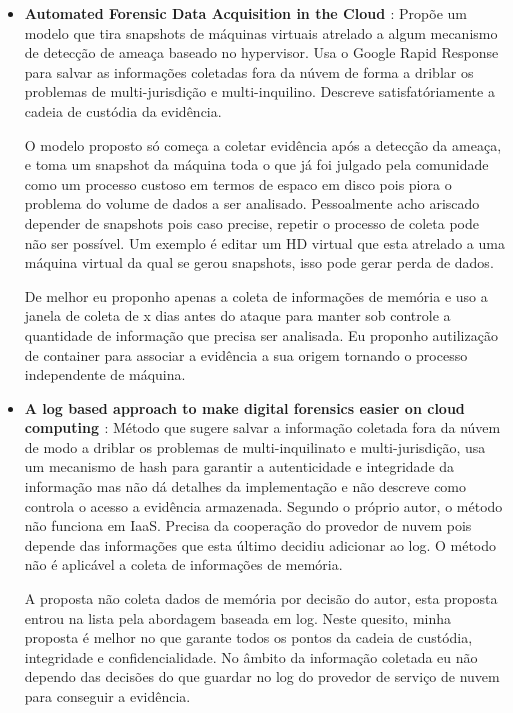 \documentclass[
	12pt,				%
	openright,			%
	oneside,			%
	a4paper,			%
	english,			%
	french,				%
	spanish,			%
	brazil,				%
	]{abntex2}
\begin{document}
\begin{itemize}
\item \textbf{Automated Forensic Data Acquisition in the Cloud \cite{Reichert2015} }: Propõe um modelo que tira snapshots de máquinas virtuais atrelado a algum mecanismo de
detecção de ameaça baseado no hypervisor. Usa o Google Rapid Response para salvar as informações coletadas fora da núvem de forma a driblar os problemas de multi-jurisdição e 
multi-inquilino. Descreve satisfatóriamente a cadeia de custódia da evidência.

O modelo proposto só começa a coletar evidência após a detecção da ameaça, e toma um snapshot da máquina toda o que já foi julgado pela comunidade como um processo custoso em
termos de espaco em disco pois piora o problema do volume de dados a ser analisado. Pessoalmente acho ariscado depender de snapshots pois caso precise, repetir o processo de coleta
pode não ser possível. Um exemplo é editar um HD virtual que esta atrelado a uma máquina virtual da qual se gerou snapshots, isso pode gerar perda de dados.

De melhor eu proponho apenas a coleta de informações de memória e uso a janela de coleta de x dias antes do ataque para manter sob controle a quantidade de informação que 
precisa ser analisada. Eu proponho autilização de container para associar a evidência a sua origem tornando o processo independente de máquina. \\
 
\item \textbf{A log based approach to make digital forensics easier on cloud computing \cite{Sang2013} }: Método que sugere salvar a informação coletada fora da núvem de modo a driblar
os problemas de multi-inquilinato e multi-jurisdição, usa um mecanismo de hash para garantir a autenticidade e integridade da informação mas não dá detalhes da implementação e 
não descreve como controla o acesso a evidência armazenada. Segundo o próprio autor, o método não funciona em IaaS. Precisa da cooperação do provedor de nuvem pois depende das
informações que esta último decidiu adicionar ao log. O método não é aplicável a coleta de informações de memória.

A proposta não coleta dados de memória por decisão do autor, esta proposta entrou na lista pela abordagem baseada em log. Neste quesito, minha proposta é melhor no que 
garante todos os pontos da cadeia de custódia, integridade e confidencialidade. No âmbito da informação coletada eu não dependo das decisões do que guardar no log do provedor 
de serviço de nuvem para conseguir a evidência. \\


\end{itemize}
\end{document}
